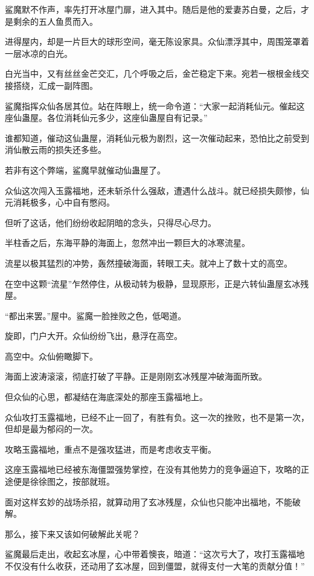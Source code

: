 \begin{this_body}
鲨魔默不作声，率先打开冰屋门扉，进入其中。随后是他的爱妻苏白曼，之后，才是剩余的五人鱼贯而入。

进得屋内，却是一片巨大的球形空间，毫无陈设家具。众仙漂浮其中，周围笼罩着一层冰凉的白光。

白光当中，又有丝丝金芒交汇，几个呼吸之后，金芒稳定下来。宛若一根根金线交接搭绕，汇成一副阵图。

鲨魔指挥众仙各居其位。站在阵眼上，统一命令道：“大家一起消耗仙元。催起这座仙蛊屋。各位消耗仙元多少，这座仙蛊屋自有记录。”

谁都知道，催动这仙蛊屋，消耗仙元极为剧烈，这一次催动起来，恐怕比之前受到消仙散云雨的损失还多些。

若非有这个弊端，鲨魔早就催动仙蛊屋了。

众仙这次闯入玉露福地，还未斩杀什么强敌，遭遇什么战斗。就已经损失颇惨，仙元消耗极多，心中自有憋闷。

但听了这话，他们纷纷收起阴暗的念头，只得尽心尽力。

半柱香之后，东海平静的海面上，忽然冲出一颗巨大的冰寒流星。

流星以极其猛烈的冲势，轰然撞破海面，转眼工夫。就冲上了数十丈的高空。

在空中这颗“流星”乍然停住，从极动转为极静，显现原形，正是六转仙蛊屋玄冰残屋。

“都出来罢。”屋中。鲨魔一脸挫败之色，低喝道。

旋即，门户大开。众仙纷纷飞出，悬浮在高空。

高空中。众仙俯瞰脚下。

海面上波涛滚滚，彻底打破了平静。正是刚刚玄冰残屋冲破海面所致。

但众仙的心思，都凝结在海底深处的那座玉露福地上。

众仙攻打玉露福地，已经不止一回了，有胜有负。这一次的挫败，也不是第一次，但却是最为郁闷的一次。

攻略玉露福地，重点不是强攻猛进，而是考虑收支平衡。

这座玉露福地已经被东海僵盟强势掌控，在没有其他势力的竞争逼迫下，攻略的正途便是徐徐图之，按部就班。

面对这样玄妙的战场杀招，就算动用了玄冰残屋，众仙也只能冲出福地，不能破解。

那么，接下来又该如何破解此关呢？

鲨魔最后走出，收起玄冰屋，心中带着懊丧，暗道：“这次亏大了，攻打玉露福地不仅没有什么收获，还动用了玄冰屋，回到僵盟，就得支付一大笔的贡献分值！”


\end{this_body}
